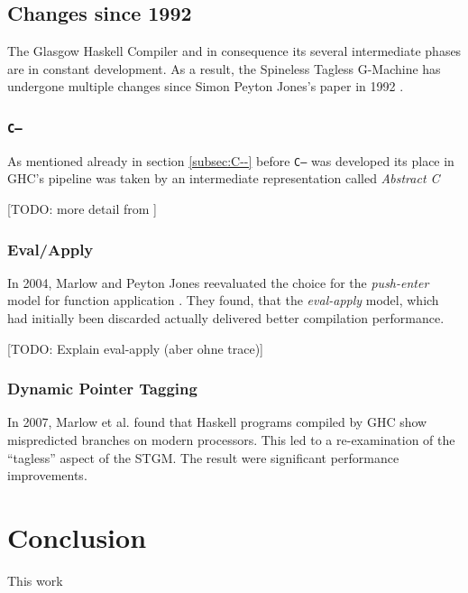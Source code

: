\documentclass[runningheads]{llncs}
\begin{document}
\subsection{Changes since 1992}
The Glasgow Haskell Compiler and in consequence its several intermediate phases are in constant development. As a result, the Spineless Tagless G-Machine has undergone multiple changes since Simon Peyton Jones's paper in 1992 \cite{jones1992implementing}. 


\subsubsection{\texttt{C--}}
As mentioned already in section \ref{subsec:C--} before \texttt{C--} was developed its place in GHC's pipeline was taken by an intermediate representation called \textit{Abstract C}

[TODO: more detail from  \cite{jones1999c}] 

\subsubsection{Eval/Apply}
In 2004, Marlow and Peyton Jones reevaluated the choice for the \textit{push-enter} model for function application \cite{marlow2004making}. They found, that the \textit{eval-apply} model, which had initially been discarded \cite{jones1992implementing} actually delivered better compilation performance.

[TODO: Explain eval-apply (aber ohne trace)]


\subsubsection{Dynamic Pointer Tagging}
In 2007, Marlow et al.\cite{marlow2007faster} found that Haskell programs compiled by GHC show mispredicted branches on modern processors. This led to a re-examination of the \enquote{tagless} aspect of the STGM. The result were significant performance improvements.


\section{Conclusion}
\label{sec:conclusion}

This work 


%
%
\newpage


\end{document}
